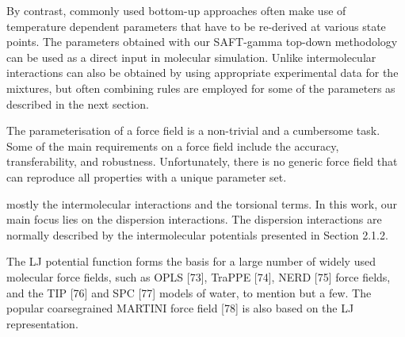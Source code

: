 By contrast, commonly used
bottom-up approaches often make use of temperature dependent parameters that have to
be re-derived at various state points. The parameters obtained with our SAFT-gamma top-down
methodology can be used as a direct input in molecular simulation. Unlike intermolecular
interactions can also be obtained by using appropriate experimental data for the mixtures,
but often combining rules are employed for some of the parameters as described in the
next section.

The parameterisation of a force field is a non-trivial and a cumbersome task. Some of
the main requirements on a force field include the accuracy, transferability, and robustness. Unfortunately, there is no generic force field that can reproduce all properties with a
unique parameter set.



mostly the intermolecular interactions and the torsional terms. In this work, our main focus lies on the
dispersion interactions. The dispersion interactions are normally described by the intermolecular potentials presented in Section 2.1.2.

The LJ potential function forms the basis for a large number of widely
used molecular force fields, such as OPLS [73], TraPPE [74], NERD [75] force fields, and
the TIP [76] and SPC [77] models of water, to mention but a few. The popular coarsegrained MARTINI force field [78] is also based on the LJ representation.

